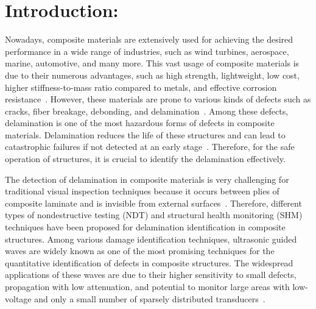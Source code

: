 \section{Introduction:}
\begin{sloppypar}
	Nowadays, composite materials are extensively used for achieving the desired performance in a wide range of industries, such as wind turbines, aerospace, marine, automotive, and many more.
	This vast usage of composite materials is due to their numerous advantages, 
	such as high strength, lightweight, low cost, higher stiffness-to-mass 
	ratio compared to metals, and effective corrosion 
	resistance~\DIFdelbegin {}\DIFdelend \DIFaddbegin {}\DIFaddend .
	However, these materials are prone to various kinds of defects such as 
	cracks, fiber breakage, debonding, and 
	delamination~\DIFdelbegin {}\DIFdelend \DIFaddbegin {}\DIFaddend .
	Among these defects, delamination is one of the most hazardous forms of defects in composite materials. 
	Delamination reduces the life of these structures and can lead to catastrophic failures if not detected at an early stage~\cite{talreja2012damage, wisnom2012role}.
	Therefore, for the safe operation of structures, it is crucial to identify the delamination effectively.

	The detection of delamination in composite materials is very challenging for traditional visual inspection techniques because it occurs between plies of composite laminate and is invisible from external surfaces~\cite{staszewski2009health, tuo2019damage}. 
	Therefore, different types of nondestructive testing (NDT) and structural health monitoring (SHM) techniques have been proposed for delamination identification in composite structures.
	Among various damage identification techniques, ultrasonic guided waves are widely known as one of the most promising techniques for the quantitative identification of defects in composite structures.
	The widespread applications of these waves are due to their higher sensitivity 
	to small defects, propagation with low attenuation, and potential to monitor 
	large areas with low-voltage and only a small number of sparsely distributed 
	transducers~\DIFdelbegin {}\DIFdelend \DIFaddbegin {}\DIFaddend . 


\end{sloppypar}
